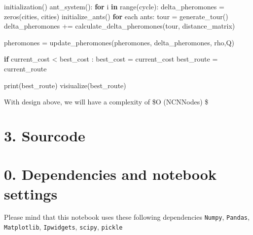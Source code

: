 \documentclass[11pt]{article}
\newenvironment{Shaded}{}{}
\newcommand{\KeywordTok}[1]{\textcolor[rgb]{0.00,0.44,0.13}{\textbf{{#1}}}}
\newcommand{\NormalTok}[1]{{#1}}
\newcommand{\ControlFlowTok}[1]{\textcolor[rgb]{0.00,0.44,0.13}{\textbf{{#1}}}}
\newcommand{\OperatorTok}[1]{\textcolor[rgb]{0.40,0.40,0.40}{{#1}}}
\newcommand{\BuiltInTok}[1]{{#1}}
\begin{document}
\begin{Shaded}
\begin{Highlighting}[]
    
\NormalTok{    initialization()}
\NormalTok{    ant_system():}
        \ControlFlowTok{for}\NormalTok{ i }\KeywordTok{in} \BuiltInTok{range}\NormalTok{(cycle):}
\NormalTok{            delta_pheromones }\OperatorTok{=}\NormalTok{ zeros(cities, cities)}
\NormalTok{            initialize_ants()}
            \ControlFlowTok{for}\NormalTok{ each ants:}
\NormalTok{                tour }\OperatorTok{=}\NormalTok{ generate_tour()}
\NormalTok{                delta_pheromones }\OperatorTok{+=}\NormalTok{ calculate_delta_pheromones(tour, distance_matrix)}
                
\NormalTok{            pheromones }\OperatorTok{=}\NormalTok{ update_pheromones(pheromones, delta_pheromones, rho,Q)}
            
            \ControlFlowTok{if}\NormalTok{ current_cost }\OperatorTok{<}\NormalTok{ best_cost : }
\NormalTok{                best_cost }\OperatorTok{=}\NormalTok{ current_cost}
\NormalTok{                best_route }\OperatorTok{=}\NormalTok{ current_route}
                
    \BuiltInTok{print}\NormalTok{(best_route)}
\NormalTok{    visiualize(best_route)}
\end{Highlighting}
\end{Shaded}

With design above, we will have a complexity of \$O
(NC\cdot N\cdot Nodes) \$

\section{3. Sourcode}\label{sourcode}

    \section{0. Dependencies and notebook
settings}\label{dependencies-and-notebook-settings}

Please mind that this notebook uses these following dependencies
\texttt{Numpy}, \texttt{Pandas}, \texttt{Matplotlib},
\texttt{Ipwidgets}, \texttt{scipy}, \texttt{pickle}
\end{document}
